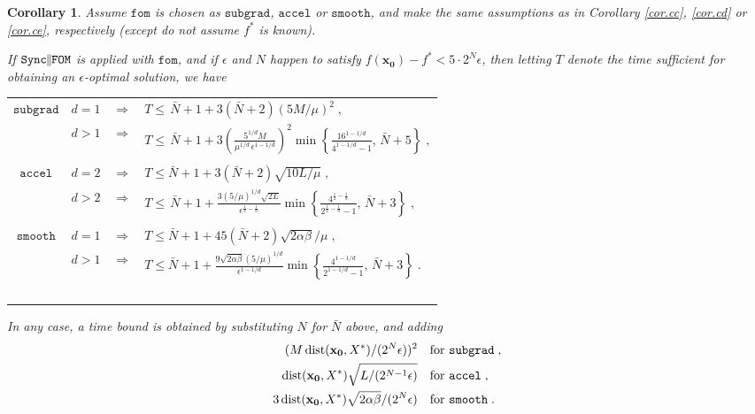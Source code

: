 \documentclass[reqno, 11pt]{amsart}
\newtheorem{cor}[prop]{Corollary}
\numberwithin{equation}{section}
\newcommand{\nt}{\negthinspace}
\newcommand{\fom}{\mathtt{fom}}
\newcommand{\parfom}{\parallel \nt \nt  \mathtt{FOM}}
\newcommand{\subgrad}{\mathtt{subgrad}}
\newcommand{\accel}{\mathtt{accel}}
\newcommand{\smooth}{\mathtt{smooth}}
\newcommand{\sparfom}{\mathtt{Sync} \nt \nt  \parfom}
\newcommand{\dist}{\mathrm{dist}}
\begin{document}
\begin{cor}  \label{cor.eb} 
Assume  $ \fom $ is chosen as $ \subgrad $, $ \accel $ or $ \smooth $, and make the same assumptions as in Corollary \ref{cor.cc}, \ref{cor.cd}  or \ref{cor.ce}, respectively (except do not assume $ f^* $ is known). 

If $ \sparfom $ is applied with $ \fom $, and if $ \epsilon $ and $ N $ happen to satisfy $ f( \mathbf{x_0}) - f^* < 5 \cdot 2^N \epsilon $, then letting $ T $ denote the time sufficient for obtaining an $ \epsilon $-optimal solution, we have

\begin{tabular}{cccl} \\
\multirow{2}{*}{$\subgrad$} 
&  $ d = 1 $  & $ \Rightarrow $ & $ T \leq \, \bar{N}+1  + 3 (\bar{N}+2) (5  M/ \mu)^2 \; , $  \\
 & $ d > 1 $ & $ \Rightarrow $ & $ T \leq \, \bar{N}+1 +  3 \left(  \frac{ 5^{1/d} M }{\mu^{1/d} \, \epsilon^{1 - 1/d}} \right)^2 \min \left\{ \frac{ 16^{1 - 1/d}}{4^{1 - 1/d} - 1}, \, \bar{N} + 5 \right\} \; ,  $ \\  \\
\multirow{2}{*}{$\accel$} 
& $ d = 2 $ & $ \Rightarrow $ & $ T \leq  \bar{N} + 1 + 3 (\bar{N}+2) \sqrt{ 10 L/\mu} \; ,  $ \\
& $ d > 2 $ & $ \Rightarrow $ & $ T \leq \, \bar{N} + 1 + \frac{3 (5/ \mu)^{1/d} \sqrt{2L}}{\epsilon^{ \frac{1}{2} - \frac{1}{d}}}   \min \left\{ \frac{4^{ \frac{1}{2} - \frac{1}{d}}}{2^{\frac{1}{2} - \frac{1}{d}} - 1}, \,  \bar{N} + 3 \right\} \; , $ \\ \\
\multirow{2}{*}{$\smooth$}
& $ d = 1 $ & $ \Rightarrow $ & $ T \leq \bar{N} + 1 +  45 (\bar{N}+2) \sqrt{ 2 \alpha \beta } / \mu \; , $ \\
& $ d > 1 $ &  $ \Rightarrow $ & $ T \leq \bar{N}+ 1 +  \frac{ 9  \sqrt{2 \alpha \beta} (5/ \mu)^{1/d}}{\epsilon^{ 1 - 1/d}}   \min \left\{ \frac{4^{ 1 - 1/d}}{2^{1 - 1/d} - 1}, \,  \bar{N} + 3 \right\} \; .  $ \\ ~
\end{tabular} 

In any case, a time bound is obtained by substituting $ N $ for $ \bar{N} $ above, and adding
\begin{align} 
 ( M \, \dist( \mathbf{x_0}, X^*)/(2^N \epsilon))^2  & \quad  \textrm{for $ \subgrad \; , $} \label{eqn.ec}  \\
 \dist( \mathbf{x_0}, X^*) \sqrt{L/ (2^{N-1} \epsilon)} & \quad \textrm{for $  \accel \; , $} \nonumber \\
  3 \, \dist( \mathbf{x_0}, X^*) \sqrt{2 \alpha \beta}/(2^N \epsilon) & \quad \textrm{for $ \smooth \; .  $} \nonumber
\end{align}
\end{cor}
\end{document}
